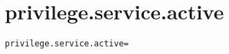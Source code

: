 \section{privilege.service.active}
\label{configuration:PrivilegeServiceActive}
\ClearAPI
\TODO
\begin{lstlisting}[style=Props,caption={Usage example for \textit{privilege.service.active}}]
privilege.service.active=
\end{lstlisting}